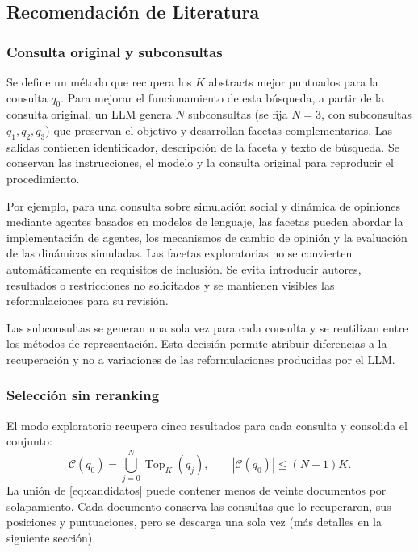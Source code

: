 \documentclass[conference]{IEEEtran}
\begin{document}
\subsection{Recomendación de Literatura}
\label{subsec:consultas}

\subsubsection{Consulta original y subconsultas}

Se define un método que recupera los $K$ abstracts mejor puntuados para la consulta $q_0$. Para mejorar el funcionamiento de esta búsqueda, a partir de la consulta original, un LLM genera $N$ subconsultas (se fija $N=3$, con subconsultas $q_1,q_2,q_3$) que preservan el objetivo y desarrollan facetas complementarias. Las salidas contienen identificador, descripción de la faceta y texto de búsqueda. Se conservan las instrucciones, el modelo y la consulta original para reproducir el procedimiento.

Por ejemplo, para una consulta sobre simulación social y dinámica de opiniones mediante agentes basados en modelos de lenguaje, las facetas pueden abordar la implementación de agentes, los mecanismos de cambio de opinión y la evaluación de las dinámicas simuladas. Las facetas exploratorias no se convierten automáticamente en requisitos de inclusión. Se evita introducir autores, resultados o restricciones no solicitados y se mantienen visibles las reformulaciones para su revisión.

Las subconsultas se generan una sola vez para cada consulta y se reutilizan entre los métodos de representación. Esta decisión permite atribuir diferencias a la recuperación y no a variaciones de las reformulaciones producidas por el LLM.

\subsubsection{Selección sin reranking}

El modo exploratorio recupera cinco resultados para cada consulta y consolida el conjunto:
\begin{equation}
 \mathcal{C}(q_0)=
 \bigcup_{j=0}^{N}\operatorname{Top}_{K}(q_j),
 \qquad |\mathcal{C}(q_0)|\leq{(N+1)K}.
 \label{eq:candidatos}
\end{equation}
La unión de \eqref{eq:candidatos} puede contener menos de veinte documentos por solapamiento. Cada documento conserva las consultas que lo recuperaron, sus posiciones y puntuaciones, pero se descarga una sola vez (más detalles en la siguiente sección).
\end{document}
